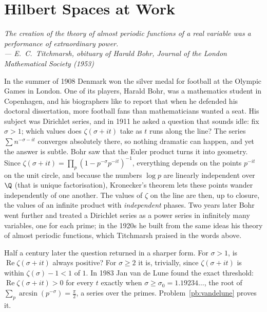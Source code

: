 \chapter{Hilbert Spaces at Work}

\begin{center}\itshape
The creation of the theory of almost periodic functions of a real variable was a performance of extraordinary power.\\
\upshape --- E.~C.~Titchmarsh, obituary of Harald Bohr, \emph{Journal of the London Mathematical Society} (1953)
\end{center}

In the summer of 1908 Denmark won the silver medal for football at the Olympic Games in London. One of its players, Harald Bohr, was
a mathematics student in Copenhagen, and his biographers like to report that when he defended his doctoral dissertation, more
football fans than mathematicians wanted a seat. His subject was Dirichlet series, and in 1911 he asked a question that sounds
idle: fix $\sigma>1$; which values does $\zeta(\sigma+it)$ take as $t$ runs along the line? The series $\sum n^{-\sigma-it}$ converges
absolutely there, so nothing dramatic can happen, and yet the answer is subtle. Bohr saw that the Euler product turns it into
geometry. Since $\zeta(\sigma+it)=\prod_p(1-p^{-\sigma}p^{-it})^{-1}$, everything depends on the points $p^{-it}$ on the unit circle,
and because the numbers $\log p$ are linearly independent over $\Q$ (that is unique factorisation), Kronecker's theorem lets these
points wander independently of one another. The values of $\zeta$ on the line are then, up to closure, the values of an infinite
product with \emph{independent} phases. Two years later Bohr went further and treated a Dirichlet series as a power series in
infinitely many variables, one for each prime; in the 1920s he built from the same ideas his theory of almost periodic functions,
which Titchmarsh praised in the words above.

Half a century later the question returned in a sharper form. For $\sigma>1$, is $\operatorname{Re}\zeta(\sigma+it)$ always positive?
For $\sigma\ge2$ it is, trivially, since $\zeta(\sigma+it)$ is within $\zeta(\sigma)-1<1$ of $1$. In 1983 Jan van de Lune found the
exact threshold: $\operatorname{Re}\zeta(\sigma+it)>0$ for every $t$ exactly when $\sigma\ge\sigma_0=1.19234\ldots$, the root of
$\sum_p\arcsin(p^{-\sigma})=\frac\pi2$, a series over the primes. Problem~\ref{pb:vandelune} proves it.

